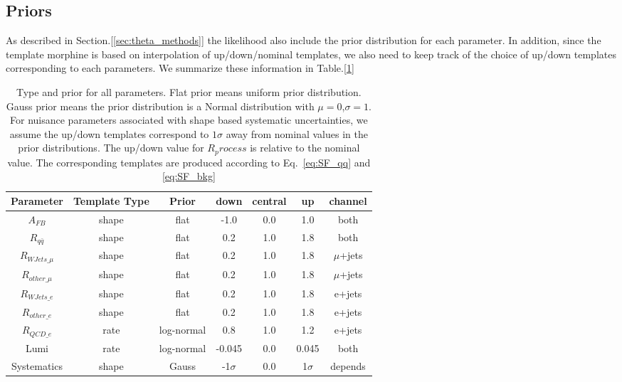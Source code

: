 \documentclass{cmspaperpdf}
\begin{document}
\subsection{Priors}
As described in Section.[\ref{sec:theta_methods}] the likelihood also include the prior distribution for each parameter. In addition, since the template morphine is based on interpolation of up/down/nominal templates, we also need to keep track of the choice of up/down templates corresponding to each parameters. We summarize these information in Table.[\ref{table:priors}]

\begin{table}[htb]
\centering
\begin{tabular}{|c|c c|c c c| c |}
\hline
Parameter     & Template Type & Prior         & down  & central  & up  & channel   \\ \hline
$A_{FB}$      & shape         & flat         & -1.0  & 0.0  & 1.0  & both \\
$R_{q\bar{q}}$ & shape         & flat         & 0.2  & 1.0  & 1.8  & both \\ \hline\hline

$R_{WJets\_\mu}$   & shape         & flat        & 0.2   & 1.0   & 1.8 & $\mu$+jets \\ 
$R_{other\_\mu}$   & shape         & flat         & 0.2   & 1.0  & 1.8 & $\mu$+jets \\
$R_{WJets\_e}$   & shape         & flat        & 0.2   & 1.0   & 1.8 & e+jets \\ 
$R_{other\_e}$   & shape         & flat         & 0.2   & 1.0  & 1.8 & e+jets \\
$R_{QCD\_e}$     & rate         & log-normal         & 0.8   & 1.0  & 1.2 & e+jets \\
Lumi          & rate          & log-normal      & -0.045 & 0.0   & 0.045 & both\\
Systematics   & shape         & Gauss      & -1$\sigma$ & 0.0 & 1$\sigma$  & depends \\ \hline\hline
\end{tabular}
\caption{Type and prior for all parameters. Flat prior means uniform prior distribution. Gauss prior means the prior distribution is a Normal distribution with $\mu=0$,$\sigma=1$. For nuisance parameters associated with shape based systematic uncertainties, we assume the up/down templates correspond to $1 \sigma$ away from nominal values in the prior distributions. The up/down value for $R_process$ is relative to the nominal value. The corresponding templates are produced according to Eq.~\ref{eq:SF_qq} and \ref{eq:SF_bkg} }
\label{table:priors}
\end{table}
\end{document}
